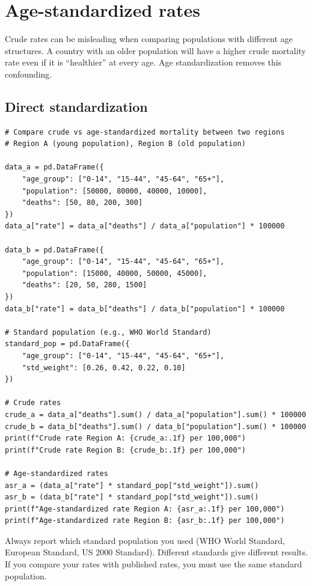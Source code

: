 \section{Age-standardized rates}

Crude rates can be misleading when comparing populations with different age structures. A country with an older population will have a higher crude mortality rate even if it is ``healthier'' at every age. Age standardization removes this confounding.

\subsection{Direct standardization}

\begin{verbatim}
# Compare crude vs age-standardized mortality between two regions
# Region A (young population), Region B (old population)

data_a = pd.DataFrame({
    "age_group": ["0-14", "15-44", "45-64", "65+"],
    "population": [50000, 80000, 40000, 10000],
    "deaths": [50, 80, 200, 300]
})
data_a["rate"] = data_a["deaths"] / data_a["population"] * 100000

data_b = pd.DataFrame({
    "age_group": ["0-14", "15-44", "45-64", "65+"],
    "population": [15000, 40000, 50000, 45000],
    "deaths": [20, 50, 280, 1500]
})
data_b["rate"] = data_b["deaths"] / data_b["population"] * 100000

# Standard population (e.g., WHO World Standard)
standard_pop = pd.DataFrame({
    "age_group": ["0-14", "15-44", "45-64", "65+"],
    "std_weight": [0.26, 0.42, 0.22, 0.10]
})

# Crude rates
crude_a = data_a["deaths"].sum() / data_a["population"].sum() * 100000
crude_b = data_b["deaths"].sum() / data_b["population"].sum() * 100000
print(f"Crude rate Region A: {crude_a:.1f} per 100,000")
print(f"Crude rate Region B: {crude_b:.1f} per 100,000")

# Age-standardized rates
asr_a = (data_a["rate"] * standard_pop["std_weight"]).sum()
asr_b = (data_b["rate"] * standard_pop["std_weight"]).sum()
print(f"Age-standardized rate Region A: {asr_a:.1f} per 100,000")
print(f"Age-standardized rate Region B: {asr_b:.1f} per 100,000")
\end{verbatim}

\begin{warningbox}
Always report which standard population you used (WHO World Standard, European Standard, US 2000 Standard). Different standards give different results. If you compare your rates with published rates, you must use the same standard population.
\end{warningbox}

